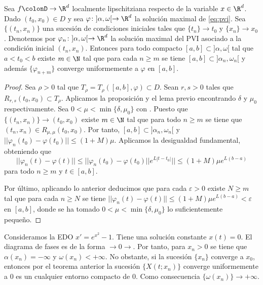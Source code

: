 \begin{theorem}
  \label{thm:cuc-ci}
  Sea $f\colonD \to \R^d$ localmente lipschitziana respecto de la variable $x \in \R^d$. Dado
  $(t_0, x_0) \in D$ y sea $\varphi \colon ]\alpha, \omega[ \to \R^d$ la solución maximal de
  \eqref{eq:pvi}. Sea $\{(t_n, x_n)\}$ una sucesión de condiciones iniciales tales que
  $\{t_n\} \to t_0$ y $\{x_n\} \to x_0$. Denotemos por $\varphi_n\colon ]\alpha, \omega[ \to \R^d$
  la solución maximal del PVI asociado a la condición inicial $(t_n, x_n)$. Entonces para todo
  compacto $[a,b]\subset ]\alpha, \omega[$ tal que $a < t_0 < b$ existe $m \in \N$ tal que para cada
  $n \ge m$ se tiene $[a,b] \subset ]\alpha_n,\omega_n[$ y además $\{\varphi_{n+m}\}$ converge
  uniformemente a $\varphi$ en $[a,b]$.
\end{theorem}
\begin{proof}
  Sea $\rho > 0$ tal que $T_{\rho} = T_{\rho}([a,b], \varphi) \subset D$. Sean $r, s > 0$ tales que
  $R_{r,s}(t_0, x_0) \subset T_{\rho}$. Aplicamos la proposición y el lema previo encontrando
  $\delta$ y $\mu_0$ respectivamente. Sea $0 < \mu < \min\{\delta, \mu_0\}$ con . Puesto que
  $\{(t_n, x_n)\} \to (t_0, x_0)$ existe $m \in \N$ tal que para todo $n \ge m$ se tiene que
  $(t_n, x_n) \in R_{\mu,\mu}(t_0, x_0)$. Por tanto, $[a,b] \subset ]\alpha_n,\omega_n[$ y
  $||\varphi_n(t_0) - \varphi(t_0)|| \le (1+M)\mu$. Aplicamos la desigualdad fundamental, obteniendo
  que
  \[||\varphi_n(t) - \varphi(t)|| \le ||\varphi_n(t_0) - \varphi(t_0)|| e^{L|t-t_0|} || \le (1+M)\mu
    e^{L(b-a)} \] para todo $n \ge m$ y $t \in [a,b]$.

  Por último, aplicando lo anterior deducimos que para cada $\varepsilon > 0$ existe $N \ge m$ tal
  que para cada $n \ge N$ se tiene
  $||\varphi_n(t) - \varphi(t)|| \le (1+M)\mu e^{L(b-a)} < \varepsilon$ en $[a,b]$, donde se ha
  tomado $0 < \mu < \min\{\delta, \mu_0\}$ lo suficientemente pequeño.
\end{proof}

\begin{ex}
  Consideramos la EDO $x' = e^{x^2} -1$. Tiene una solución constante $x(t) = 0$. El diagrama de
  fases es de la forma $\rightarrow 0 \rightarrow$. Por tanto, para $x_n > 0$ se tiene que
  $\alpha(x_n) = -\infty$ y $\omega(x_n) < +\infty$. No obstante, si la sucesión $\{x_n\}$ converge
  a $x_0$, entonces por el teorema anterior la sucesión $\{X(t;x_n)\}$ converge uniformemente a $0$
  es un cualquier entorno compacto de $0$. Como consecuencia $\{\omega(x_n)\} \to +\infty$.
\end{ex}

